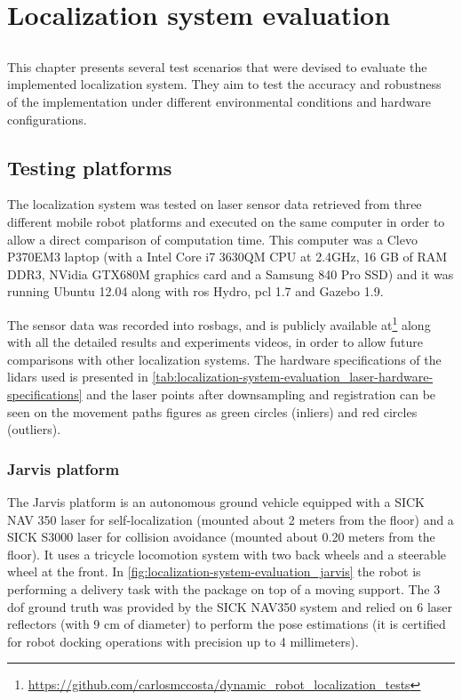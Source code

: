 \chapter{Localization system evaluation} \label{chap:localization-system-evaluation}



\section*{}

This chapter presents several test scenarios that were devised to evaluate the implemented localization system. They aim to test the accuracy and robustness of the implementation under different environmental conditions and hardware configurations.



\section{Testing platforms}

The localization system was tested on laser sensor data retrieved from three different mobile robot platforms and executed on the same computer in order to allow a direct comparison of computation time. This computer was a Clevo P370EM3 laptop (with a Intel Core i7 3630QM CPU at 2.4GHz, 16 GB of RAM DDR3, NVidia GTX680M graphics card and a Samsung 840 Pro SSD) and it was running Ubuntu 12.04 along with \gls{ros} Hydro, \gls{pcl} 1.7 and Gazebo 1.9.

The sensor data was recorded into rosbags, and is publicly available at\footnote{\url{https://github.com/carlosmccosta/dynamic_robot_localization_tests}} along with all the detailed results and experiments videos, in order to allow future comparisons with other localization systems. The hardware specifications of the \glspl{lidar} used is presented in \cref{tab:localization-system-evaluation_laser-hardware-specifications} and the laser points after downsampling and registration can be seen on the movement paths figures as green circles (inliers) and red circles (outliers).


\subsection{Jarvis platform}

The Jarvis platform is an autonomous ground vehicle equipped with a SICK NAV 350 laser for self-localization (mounted about 2 meters from the floor) and a SICK S3000 laser for collision avoidance (mounted about 0.20 meters from the floor). It uses a tricycle locomotion system with two back wheels and a steerable wheel at the front. In \cref{fig:localization-system-evaluation_jarvis} the robot is performing a delivery task with the package on top of a moving support. The 3 \gls{dof} ground truth was provided by the SICK NAV350 system and relied on 6 laser reflectors (with 9 cm of diameter) to perform the pose estimations (it is certified for robot docking operations with precision up to 4 millimeters).

